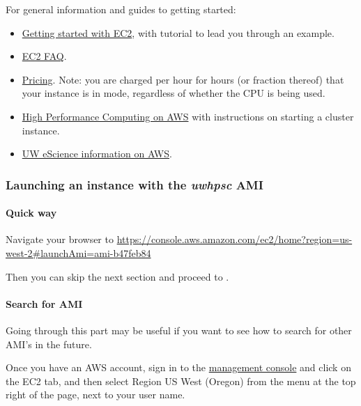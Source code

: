 \documentclass[letterpaper,10pt,english]{sphinxmanual}
\begin{document}
For general information and guides to getting started:
\begin{itemize}
\item {} 
\href{http://docs.amazonwebservices.com/AWSEC2/latest/GettingStartedGuide/}{Getting started with EC2},
with tutorial to lead you through an example.

\item {} 
\href{http://aws.amazon.com/ec2/faqs}{EC2 FAQ}.

\item {} 
\href{http://aws.amazon.com/ec2/\#pricing}{Pricing}.  Note: you are charged
per hour for hours (or fraction thereof) that your instance is in
 mode, regardless of whether the CPU is being used.

\item {} 
\href{http://aws.amazon.com/hpc-applications/}{High Performance Computing on AWS}
with instructions on starting a cluster instance.

\item {} 
\href{http://escience.washington.edu/get-help-now/get-started-amazon-web-services}{UW eScience information on AWS}.

\end{itemize}


\subsubsection{Launching an instance with the \emph{uwhpsc} AMI}
\label{2013/aws:launching-an-instance-with-the-uwhpsc-ami}

\paragraph{Quick way}
\label{2013/aws:quick-way}
Navigate your browser to
\url{https://console.aws.amazon.com/ec2/home?region=us-west-2\#launchAmi=ami-b47feb84}

Then you can skip the next section and proceed to .


\paragraph{Search for AMI}
\label{2013/aws:search-for-ami}
Going through this part may be useful if you want to see how to search for
other AMI's in the future.

Once you have an AWS account, sign in to the
\href{https://console.aws.amazon.com/ec2/}{management console}
and click on the
EC2 tab, and then select Region US West (Oregon) from the menu
at the top right of the page, next to your user name.
\end{document}
